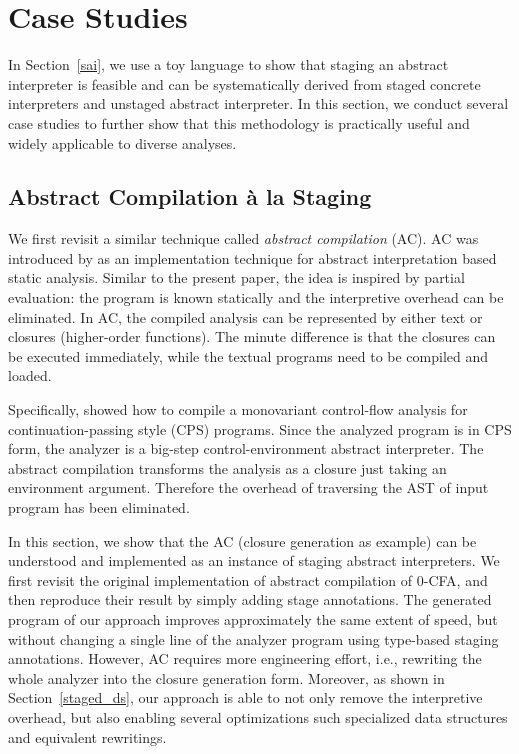 \section{Case Studies} \label{cases_study}

In Section~\ref{sai}, we use a toy language to show that staging an abstract
interpreter is feasible and can be systematically derived from staged concrete
interpreters and unstaged abstract interpreter.
In this section, we conduct several case studies to further show that this
methodology is practically useful and widely applicable to diverse analyses.

\subsection{Abstract Compilation \`a la Staging} \label{cs_ac}

We first revisit a similar technique called \textit{abstract compilation} (AC).
AC was introduced by \citet{Boucher:1996:ACN:647473.727587} as an
implementation technique for abstract interpretation based static analysis.
Similar to the present paper, the idea is inspired by partial evaluation:
the program is known statically and the interpretive overhead can be
eliminated. In AC, the compiled analysis can be represented by either text or
closures (higher-order functions). The minute difference is that the closures
can be executed immediately, while the textual programs need to be compiled and
loaded.

Specifically, \citeauthor{Boucher:1996:ACN:647473.727587} showed how to compile a
monovariant control-flow analysis \cite{Shivers:1991:SSC:115865.115884,
Shivers:1988:CFA:53990.54007} for continuation-passing style (CPS) programs.
Since the analyzed program is in CPS form, the analyzer is a big-step
control-environment abstract interpreter. The abstract compilation transforms
the analysis as a closure just taking an environment argument. Therefore the
overhead of traversing the AST of input program has been eliminated.

In this section, we show that the AC (closure generation as example) can be
understood and implemented as an instance of staging abstract interpreters. We
first revisit the original implementation of abstract compilation of 0-CFA, and
then reproduce their result by simply adding stage annotations.
The generated program of our approach improves approximately the same extent of
speed, but without changing a single line of the analyzer program using
type-based staging annotations. However, AC requires more engineering effort,
i.e., rewriting the whole analyzer into the closure generation form. Moreover,
as shown in Section~\ref{staged_ds}, our approach is able to not only remove the
interpretive overhead, but also enabling several optimizations such specialized
data structures and equivalent rewritings.

